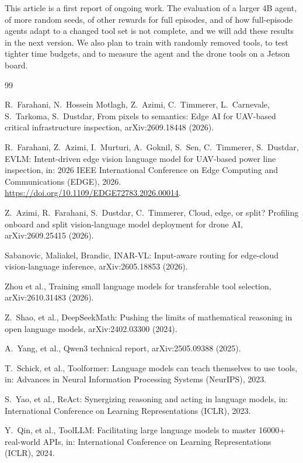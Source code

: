 \documentclass[final,5p,times,twocolumn]{elsarticle}
\begin{document}
This article is a first report of ongoing work. The evaluation of a larger 4B agent, of more random seeds, of other rewards for full episodes, and of how full-episode agents adapt to a changed tool set is not complete, and we will add these results in the next version. We also plan to train with randomly removed tools, to test tighter time budgets, and to measure the agent and the drone tools on a Jetson board.

\begin{thebibliography}{99}

 R.~Farahani, N.~Hossein Motlagh, Z.~Azimi, C.~Timmerer, L.~Carnevale, S.~Tarkoma, S.~Dustdar, From pixels to semantics: Edge AI for UAV-based critical infrastructure inspection, arXiv:2609.18448 (2026).

 R.~Farahani, Z.~Azimi, I.~Murturi, A.~Goknil, S.~Sen, C.~Timmerer, S.~Dustdar, EVLM: Intent-driven edge vision language model for UAV-based power line inspection, in: 2026 IEEE International Conference on Edge Computing and Communications (EDGE), 2026. \url{https://doi.org/10.1109/EDGE72783.2026.00014}.

 Z.~Azimi, R.~Farahani, S.~Dustdar, C.~Timmerer, Cloud, edge, or split? Profiling onboard and split vision-language model deployment for drone AI, arXiv:2609.25415 (2026).

 Sabanovic, Maliakel, Brandic, INAR-VL: Input-aware routing for edge-cloud vision-language inference, arXiv:2605.18853 (2026).

 Zhou et al., Training small language models for transferable tool selection, arXiv:2610.31483 (2026).

 Z.~Shao, et al., DeepSeekMath: Pushing the limits of mathematical reasoning in open language models, arXiv:2402.03300 (2024).

 A.~Yang, et al., Qwen3 technical report, arXiv:2505.09388 (2025).

 T.~Schick, et al., Toolformer: Language models can teach themselves to use tools, in: Advances in Neural Information Processing Systems (NeurIPS), 2023.

 S.~Yao, et al., ReAct: Synergizing reasoning and acting in language models, in: International Conference on Learning Representations (ICLR), 2023.

 Y.~Qin, et al., ToolLLM: Facilitating large language models to master 16000+ real-world APIs, in: International Conference on Learning Representations (ICLR), 2024.


\end{thebibliography}
\end{document}

